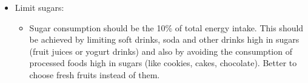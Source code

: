 \begin{itemize}[nosep]
\begin{itemize}[nosep]
          \end{itemize}
          \vspace{3ex}
    \item Limit sugars:\vspace{2ex}
          \begin{itemize}[nosep]
              \item Sugar consumption should be the 10\% of total energy intake. This should be achieved by limiting soft drinks, soda and other drinks high in sugars (fruit juices or yogurt drinks) and also by avoiding the consumption of processed foods high in sugars (like cookies, cakes, chocolate). Better to choose fresh fruits instead of them.
          \end{itemize}
\end{itemize}
\vspace{3ex}
